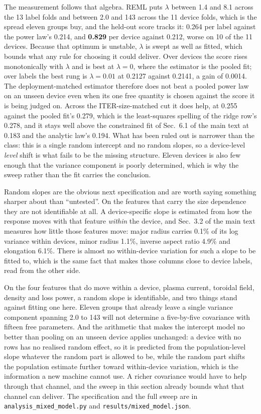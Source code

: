 \documentclass[12pt,letterpaper]{article}
\begin{document}
The measurement follows that algebra. REML puts $\lambda$ between 1.4 and 8.1
across the 13 label folds and between 2.0 and 143 across the 11 device folds,
which is the spread eleven groups buy, and the held-out score tracks it: 0.264
per label against the power law's 0.214, and \textbf{0.829} per device against
0.212, worse on 10 of the 11 devices. Because that optimum is unstable, $\lambda$
is swept as well as fitted, which bounds what any rule for choosing it could
deliver. Over devices the score rises monotonically with $\lambda$ and is best
at $\lambda=0$, where the estimator is the pooled fit; over labels the best rung
is $\lambda=0.01$ at 0.2127 against 0.2141, a gain of 0.0014. The
deployment-matched estimator therefore does not beat a pooled power law on an
unseen device even when its one free quantity is chosen against the score it is
being judged on. Across the ITER-size-matched cut it does help, at 0.255 against
the pooled fit's 0.279, which is the least-squares spelling of the ridge row's
0.278, and it stays well above the constrained fit of
Sec.~6.1 of the main text at 0.183 and the analytic law's 0.194. What has been ruled out is
narrower than the class: this is a single random intercept and no random slopes,
so a device-level \emph{level} shift is what fails to be the missing structure.
Eleven devices is also few enough that the variance component is poorly
determined, which is why the sweep rather than the fit carries the conclusion.

Random slopes are the obvious next specification and are worth saying something
sharper about than ``untested''. On the features that carry the size dependence
they are not identifiable at all. A device-specific slope is estimated from how
the response moves with that feature \emph{within} the device, and Sec.~3.2 of
the main text measures how little those features move: major radius carries
0.1\% of its log variance within devices, minor radius 1.1\%, inverse aspect
ratio 4.9\% and elongation 6.1\%. There is almost no within-device variation for
such a slope to be fitted to, which is the same fact that makes those columns
close to device labels, read from the other side.

On the four features that do move within a device, plasma current, toroidal
field, density and loss power, a random slope is identifiable, and two things
stand against fitting one here. Eleven groups that already leave a single
variance component spanning 2.0 to 143 will not determine a
five-by-five covariance with fifteen free parameters. And the arithmetic that
makes the intercept model no better than pooling on an unseen device applies
unchanged: a device with no rows has no realised random effect, so it is
predicted from the population-level slope whatever the random part is allowed to
be, while the random part shifts the population estimate further toward
within-device variation, which is the information a new machine cannot use. A
richer covariance would have to help through that channel, and the sweep in this
section already bounds what that channel can deliver. The specification and the full sweep
are in \texttt{analysis\_mixed\_model.py} and
\texttt{results/mixed\_model.json}.
\end{document}
